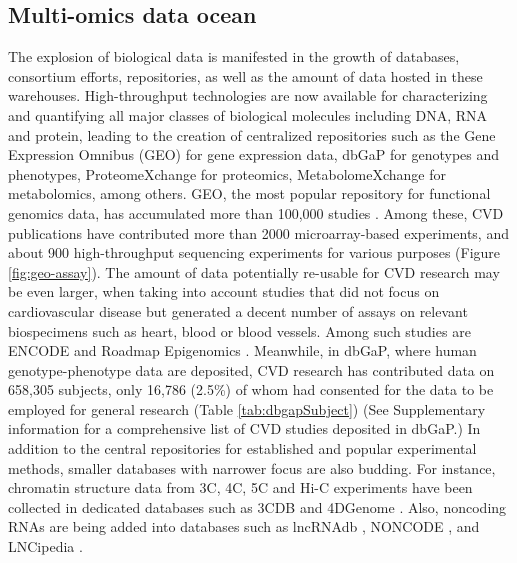 \documentclass[letter]{bioinfo}
\begin{document}
	\subsection*{Multi-omics data ocean}
    The explosion of biological data is manifested in the growth of databases, consortium efforts, repositories, as well as the amount of data hosted in these warehouses. High-throughput technologies are now available for characterizing and quantifying all major classes of biological molecules including DNA, RNA and protein, leading to the creation of centralized repositories such as the Gene Expression Omnibus (GEO) \citep{Barrett:2013:NCBI} for gene expression data, dbGaP \citep{Tryka:2014:dbGaP} for genotypes and phenotypes, ProteomeXchange \citep{Vizcaino:2014:ProteomeXchange,Deutsch:2017:ProteomeXchange} for proteomics, MetabolomeXchange for metabolomics, among others.  GEO, the most popular repository for functional genomics data, has accumulated more than 100,000 studies \citep{Zhu:2008:GEOmetadb}. Among these, CVD publications have contributed more than 2000 microarray-based experiments, and about 900 high-throughput sequencing experiments for various purposes (Figure \ref{fig:geo-assay}). The amount of data potentially re-usable for CVD research may be even larger, when taking into account studies that did not focus on cardiovascular disease but generated a decent number of assays on relevant biospecimens such as heart, blood or blood vessels. Among such studies are ENCODE \citep{ENCODE:2012:integrated} and Roadmap Epigenomics \citep{Roadmap:2015:Integrative}.
	Meanwhile, in dbGaP, where human genotype-phenotype data are deposited, CVD research has contributed data on 658,305 subjects, only 16,786 (2.5\%) of whom had consented for the data to be employed for general research (Table \ref{tab:dbgapSubject}) (See Supplementary information for a comprehensive list of CVD studies deposited in dbGaP.)
	In addition to the central repositories for established and popular experimental methods, smaller databases with narrower focus are also budding. For instance, chromatin structure data from 3C, 4C, 5C and Hi-C experiments have been collected in dedicated databases such as 3CDB \citep{Yun:2016:3CDB} and 4DGenome \citep{Teng:2015:4DGenome}. Also, noncoding RNAs are being added into databases such as lncRNAdb \citep{Quek:2015:lncRNAdb}, NONCODE \citep{Fang:2018:NONCODEV5}, and LNCipedia \citep{Volders:2018:LNCipedia}.
	
\end{document}
